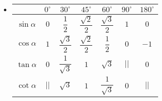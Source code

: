 \begin{itemize}
\begin{tcolorbox}[colframe=orange,colback=white,boxrule=0.2mm]
\end{tcolorbox}
	\item [\iconMT] 
	\begin{center}
		\renewcommand{\arraystretch}{2}
		\begin{tabular}{|c|c|c|c|c|c|c|}
			\hline
		 & $0^\circ$ & $30^\circ$ & $45^\circ$ & $60^\circ$ & $90^\circ$ & $180^\circ$\\
			\hline
			$\sin \alpha$  & $0$ & $\dfrac{1}{2}$ & $\dfrac{\sqrt{2}}{2}$ & $\dfrac{\sqrt{3}}{2}$ & $1$ & $0$\\
			\hline
			$\cos \alpha$  & $1$ & $\dfrac{\sqrt{3}}{2}$ & $\dfrac{\sqrt{2}}{2}$ & $\dfrac{1}{2}$ & $0$ & $-1$\\
			\hline
			$\tan \alpha$ & $0$ & $\dfrac{1}{\sqrt{3}}$ & $1$ & $\sqrt{3}$ & $\big|\big|$ & $0$\\
			\hline
			$\cot \alpha$ & $\big|\big|$ & $\sqrt{3}$ & $1$ & $\dfrac{1}{\sqrt{3}}$ & $0$ & $\big|\big|$\\
			\hline
		\end{tabular}
	\end{center}
\end{itemize}
